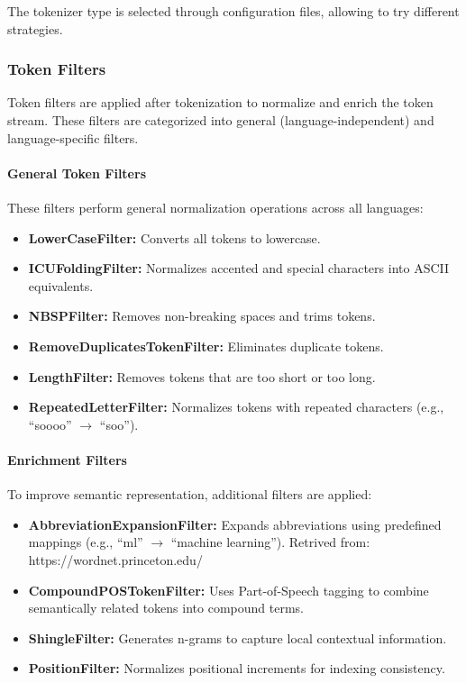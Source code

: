 The tokenizer type is selected through configuration files, allowing to try different strategies.

\subsubsection{Token Filters}

Token filters are applied after tokenization to normalize and enrich the token stream. These filters are categorized into general (language-independent) and language-specific filters.

\paragraph{General Token Filters}

These filters perform general normalization operations across all languages:

\begin{itemize}
    \item \textbf{LowerCaseFilter:} Converts all tokens to lowercase.
    \item \textbf{ICUFoldingFilter:} Normalizes accented and special characters into ASCII equivalents.
    \item \textbf{NBSPFilter:} Removes non-breaking spaces and trims tokens.
    \item \textbf{RemoveDuplicatesTokenFilter:} Eliminates duplicate tokens.
    \item \textbf{LengthFilter:} Removes tokens that are too short or too long.
    \item \textbf{RepeatedLetterFilter:} Normalizes tokens with repeated characters (e.g., ``soooo'' $\rightarrow$ ``soo'').
\end{itemize}

\paragraph{Enrichment Filters}

To improve semantic representation, additional filters are applied:

\begin{itemize}
    \item \textbf{AbbreviationExpansionFilter:} Expands abbreviations using predefined mappings (e.g., ``ml'' $\rightarrow$ ``machine learning''). Retrived from: https://wordnet.princeton.edu/
    \item \textbf{CompoundPOSTokenFilter:} Uses Part-of-Speech tagging to combine semantically related tokens into compound terms.
    \item \textbf{ShingleFilter:} Generates n-grams to capture local contextual information.
    \item \textbf{PositionFilter:} Normalizes positional increments for indexing consistency.
\end{itemize}

